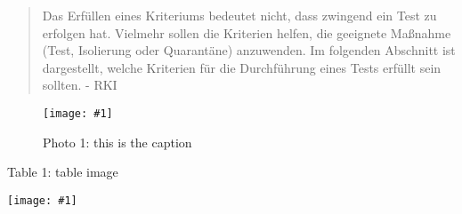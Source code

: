 \documentclass{article}
\newlength{\imgwidth}
\newcommand\scaledgraphics[2]{%
                
\settowidth{\imgwidth}{\texttt{[image: \#1]}}%
                
\setlength{\imgwidth}{\minof{\imgwidth}{#2\textwidth}}%
                
\texttt{[image: \#1]}%
                
}
\begin{document}
\begin{quote}



Das Erfüllen eines Kriteriums bedeutet nicht, dass zwingend ein Test zu erfolgen hat. Vielmehr sollen die Kriterien helfen, die geeignete Maßnahme (Test, Isolierung oder Quarantäne) anzuwenden. Im folgenden Abschnitt ist dargestellt, welche Kriterien für die Durchführung eines Tests erfüllt sein sollten. - RKI


\end{quote}




\begin{figure}
\scaledgraphics{658d0842-c956-4d61-8cc8-dccaa45f72c6.png}{1}
\caption*{Photo 1: this is the caption }\label{F41274951}
\end{figure}




\begin{table}
\caption*{Table 1: table image}\label{F27326161}
\scaledgraphics{46bf2518-19bf-4837-b334-601f0c61a11d.png}{1}
\texorpdfstring{\protect\hypertarget{F27326161}{}}{}
\end{table}


                    
\end{document}
